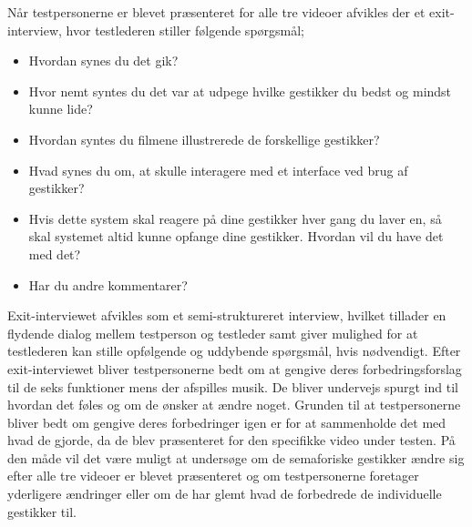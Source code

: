 Når testpersonerne er blevet præsenteret for alle tre videoer afvikles der et exit-interview, hvor testlederen stiller følgende spørgsmål; \blankline
%
\begin{itemize}
  \item Hvordan synes du det gik? 
  \item Hvor nemt syntes du det var at udpege hvilke gestikker du bedst og mindst kunne lide? 
  \item Hvordan syntes du filmene illustrerede de forskellige gestikker? 
  \item Hvad synes du om, at skulle interagere med et interface ved brug af gestikker? 
  \item Hvis dette system skal reagere på dine gestikker hver gang du laver en, så skal systemet altid kunne opfange dine gestikker. Hvordan vil du have det med det? 
  \item Har du andre kommentarer?\blankline
\end{itemize}
\noindent
%
Exit-interviewet afvikles som et semi-struktureret interview, hvilket tillader en flydende dialog mellem testperson og testleder samt giver mulighed for at testlederen kan stille opfølgende og uddybende spørgsmål, hvis nødvendigt. Efter exit-interviewet bliver testpersonerne bedt om at gengive deres forbedringsforslag til de seks funktioner mens der afspilles musik. De bliver undervejs spurgt ind til hvordan det føles og om de ønsker at ændre noget. Grunden til at testpersonerne bliver bedt om gengive deres forbedringer igen er for at sammenholde det med hvad de gjorde, da de blev præsenteret for den specifikke video under testen. På den måde vil det være muligt at undersøge om de semaforiske gestikker ændre sig efter alle tre videoer er blevet præsenteret og om testpersonerne foretager yderligere ændringer eller om de har glemt hvad de forbedrede de individuelle gestikker til.    
%

